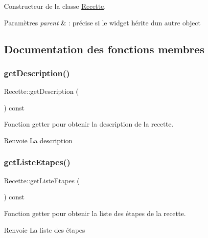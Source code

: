 Constructeur de la classe \hyperlink{classRecette}{Recette}. 


\begin{DoxyParams}{Paramètres}
{\em parent} & \+: précise si le widget hérite d\textquotesingle{}un autre object \\
\hline
\end{DoxyParams}


\subsection{Documentation des fonctions membres}
\mbox{\label{classRecette_a7f3746b691f39d1b468b29819ad3c265}} 
\subsubsection{\texorpdfstring{get\+Description()}{getDescription()}}
{\footnotesize\ttfamily Recette\+::get\+Description (\begin{DoxyParamCaption}{ }\end{DoxyParamCaption}) const}



Fonction getter pour obtenir la description de la recette. 

\begin{DoxyReturn}{Renvoie}
La description 
\end{DoxyReturn}
\mbox{\label{classRecette_a3b2807fe1f55431bcd632bff2332c6e7}} 
\subsubsection{\texorpdfstring{get\+Liste\+Etapes()}{getListeEtapes()}}
{\footnotesize\ttfamily Recette\+::get\+Liste\+Etapes (\begin{DoxyParamCaption}{ }\end{DoxyParamCaption}) const}



Fonction getter pour obtenir la liste des étapes de la recette. 

\begin{DoxyReturn}{Renvoie}
La liste des étapes 
\end{DoxyReturn}
\mbox{\label{classRecette_a3ca29579050212dea9da71e9c1f05119}} 
